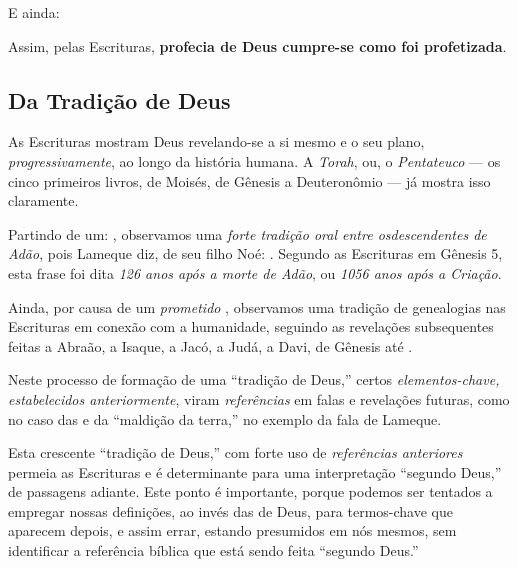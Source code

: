     E ainda:


    Assim, pelas Escrituras, \textbf{profecia de Deus cumpre-se como foi profetizada}.

    \subsection{Da Tradição de Deus}

    As Escrituras mostram Deus revelando-se a si mesmo e o seu plano, \emph{progressivamente}, ao longo da  história  humana.  A
    \emph{Torah}, ou, o \emph{Pentateuco} --- os cinco primeiros livros, de Moisés, de Gênesis a Deuteronômio --- já mostra isso
    claramente.

    Partindo de um: , observamos uma \emph{forte tradição oral entre osdescendentes de Adão}, pois  Lameque  diz,
    de seu filho Noé: . Segundo as Escrituras em Gênesis 5, esta frase foi dita \emph{126
    anos após a morte de Adão}, ou \emph{1056 anos após a Criação}.

    Ainda, por causa de um \emph{prometido} ,  observamos  uma  tradição  de
    genealogias nas Escrituras em conexão com a humanidade, seguindo as revelações subsequentes feitas a  Abraão,  a  Isaque,  a
    Jacó, a Judá, a Davi, de Gênesis até .

    Neste processo de formação de uma ``tradição de Deus,'' certos \emph{elementos-chave,  estabelecidos  anteriormente},  viram
    \emph{referências} em falas e revelações futuras, como no caso das  e da ``maldição da terra,''  no  exemplo
    da fala de Lameque.

    Esta crescente ``tradição de Deus,'' com forte uso de \emph{referências anteriores} permeia as Escrituras e  é  determinante
    para uma interpretação ``segundo Deus,'' de passagens adiante. Este ponto  é  importante,  porque  podemos  ser  tentados  a
    empregar nossas definições, ao invés das de Deus, para termos-chave que aparecem depois, e assim errar,  estando  presumidos
    em nós mesmos, sem identificar a referência bíblica que está sendo feita ``segundo Deus.''

